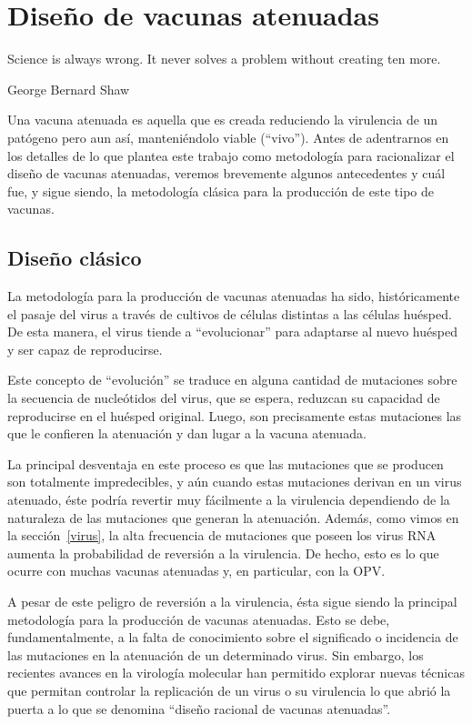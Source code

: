 \chapter{Dise\~no de vacunas atenuadas}
\label{diseno}
\epigraph{Science is always wrong. It never solves a problem without creating
ten more.}%
{George Bernard Shaw}

Una vacuna atenuada es aquella que es creada reduciendo la virulencia de un
pat\'ogeno pero aun as\'i, manteni\'endolo viable (``vivo''). Antes de
adentrarnos en los detalles de lo que plantea este trabajo como metodolog\'ia
para racionalizar el dise\~no de vacunas atenuadas, veremos brevemente algunos
antecedentes y cu\'al fue, y sigue siendo, la metodolog\'ia cl\'asica para la
producci\'on de este tipo de vacunas.

\section{Dise\~no cl\'asico}

La metodolog\'ia para la producci\'on de vacunas atenuadas ha sido,
hist\'oricamente el pasaje del virus a trav\'es de cultivos de c\'elulas
distintas a las c\'elulas hu\'esped. De esta manera, el virus tiende a
``evolucionar'' para adaptarse al nuevo hu\'esped y ser capaz de reproducirse.

Este concepto de ``evoluci\'on'' se traduce en alguna cantidad de mutaciones
sobre la secuencia de nucle\'otidos del virus, que se espera, reduzcan su
capacidad de reproducirse en el hu\'esped original. Luego, son precisamente
estas mutaciones las que le confieren la atenuaci\'on y dan lugar a la vacuna
atenuada.

La principal desventaja en este proceso es que las mutaciones que se producen
son totalmente impredecibles, y a\'un cuando estas mutaciones derivan en un
virus atenuado, \'este podr\'ia revertir muy f\'acilmente a la virulencia
dependiendo de la naturaleza de las mutaciones que generan la
atenuaci\'on\cite{Badgett02}.
Adem\'as, como vimos en la secci\'on~\ref{virus}, la alta frecuencia de
mutaciones que poseen los virus \ac{RNA} aumenta la probabilidad de reversi\'on
a la virulencia. De hecho, esto es lo que ocurre con muchas vacunas atenuadas y,
en particular, con la \ac{OPV}.

A pesar de este peligro de reversi\'on a la virulencia, \'esta sigue siendo la
principal metodolog\'ia para la producci\'on de vacunas atenuadas. Esto se debe,
fundamentalmente, a la falta de conocimiento sobre el significado o incidencia
de las mutaciones en la atenuaci\'on de un determinado virus. Sin embargo, los
recientes avances en la virolog\'ia molecular han permitido explorar nuevas
t\'ecnicas que permitan controlar la replicaci\'on de un virus o su virulencia
lo que abri\'o la puerta a lo que se denomina ``dise\~no racional de vacunas
atenuadas''\cite{Lauring10}.

